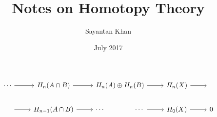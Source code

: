 \documentclass[12pt, notitlepage]{article}
\title{Notes on Homotopy Theory}
\author{Sayantan Khan}
\date{July 2017}
\theoremstyle{definition}
\begin{document}
\maketitle

\tableofcontents

\newpage

\[
\begin{tikzcd}[arrows=to]
\cdots \rar & H_n(A \cap B) \rar & H_n(A) \oplus H_n(B) \rar & H_n(X) \rar & \hphantom{0}\\
\hphantom{\cdots} \rar 
& H_{n-1}(A \cap B) \rar 
& \makebox[\widthof{$H_n(A) \oplus H_n(B)$}][c]{$\cdots\hfill \cdots$} \rar
&  H_0(X) \rar & 0
\end{tikzcd}
\]




\end{document}
